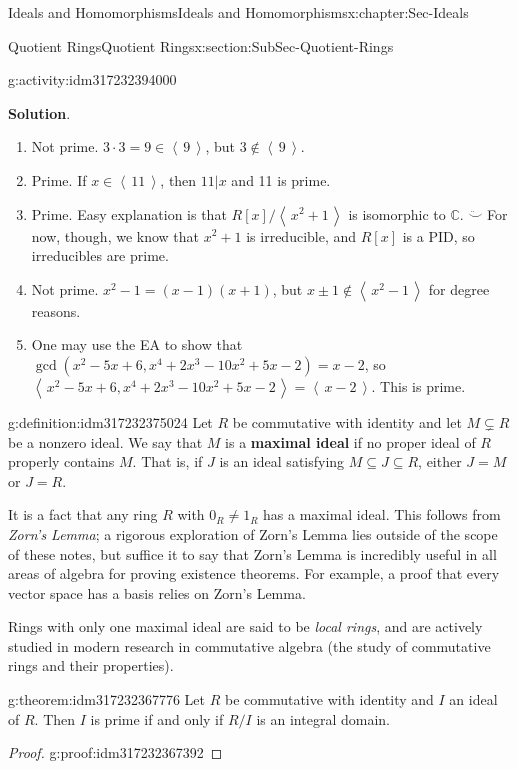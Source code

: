 \documentclass[oneside,10pt,]{book}
\newcommand{\blocktitlefont}{\relax}
\newcommand{\terminology}[1]{\textbf{#1}}
\numberwithin{equation}{section}
\newcommand{\ideal}[1]{\left\langle\, #1 \,\right\rangle}
\def\C{{\mathbb C}}
\begin{document}
\begin{chapterptx}{Ideals and Homomorphisms}{}{Ideals and Homomorphisms}{}{}{x:chapter:Sec-Ideals}
\begin{sectionptx}{Quotient Rings}{}{Quotient Rings}{}{}{x:section:SubSec-Quotient-Rings}
\begin{activity}{}{g:activity:idm317232394000}
\begin{enumerate}
\end{enumerate}
%
\par\smallskip%
\noindent\textbf{\blocktitlefont Solution}.\hypertarget{g:solution:idm317232385264}{}\quad{}%
\begin{enumerate}
\item{}Not prime. \(3\cdot 3= 9\in \ideal{9}\), but \(3\notin\ideal{9}\).%
\item{}Prime. If \(x\in \ideal{11}\), then \(11|x\) and 11 is prime.%
\item{}Prime. Easy explanation is that \(R[x]/\ideal{x^2+1}\) is isomorphic to \(\C\). \(\ddot\smile\) For now, though, we know that \(x^2+1\) is irreducible, and \(R[x]\) is a PID, so irreducibles are prime.%
\item{}Not prime. \(x^2-1 = (x-1)(x+1)\), but \(x\pm 1\notin \ideal{x^2-1}\) for degree reasons.%
\item{}One may use the EA to show that \(\gcd(x^2-5x+6,x^4+2x^3-10x^2+5x-2) = x-2\), so \(\ideal{x^2-5x+6, x^4+2x^3-10x^2+5x-2} = \ideal{x-2}\). This is prime.%
\end{enumerate}
%
\end{activity}
\begin{definition}{}{g:definition:idm317232375024}%
Let \(R\) be commutative with identity and let \(M\subsetneq R\) be a nonzero ideal. We say that \(M\) is a \terminology{maximal ideal} if no proper ideal of \(R\) properly contains \(M\). That is, if \(J\) is an ideal satisfying \(M\subseteq J\subseteq R\), either \(J=M\) or \(J=R\).%
\end{definition}
It is a fact that any ring \(R\) with \(0_R\ne 1_R\) has a maximal ideal. This follows from \emph{Zorn's Lemma}; a rigorous exploration of Zorn's Lemma lies outside of the scope of these notes, but suffice it to say that Zorn's Lemma is incredibly useful in all areas of algebra for proving existence theorems. For example, a proof that every vector space has a basis relies on Zorn's Lemma.%
\par
Rings with only one maximal ideal are said to be \emph{local rings}, and are actively studied in modern research in commutative algebra (the study of commutative rings and their properties).%
\begin{theorem}{}{}{g:theorem:idm317232367776}%
Let \(R\) be commutative with identity and \(I\) an ideal of \(R\). Then \(I\) is prime if and only if \(R/I\) is an integral domain.%
\end{theorem}
\begin{proof}{}{g:proof:idm317232367392}

\end{proof}
\end{sectionptx}
\end{chapterptx}
\end{document}
